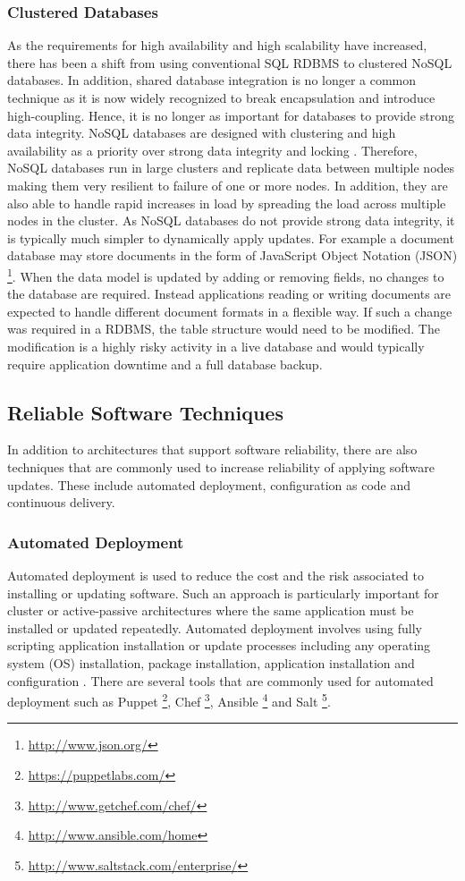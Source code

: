 \documentclass[a4paper,11pt,twoside]{article}
\begin{document}
\subsubsection{Clustered Databases}
As the requirements for high availability and high scalability have increased, there has been a shift from using conventional SQL RDBMS to clustered NoSQL databases. In addition, shared database integration is no longer a common technique as it is now widely recognized to break encapsulation and introduce high-coupling. Hence, it is no longer as important for databases to provide strong data integrity. NoSQL databases are designed with clustering and high availability as a priority over strong data integrity and locking \cite{NoSQL}. Therefore, NoSQL databases run in large clusters and replicate data between multiple nodes making them very resilient to failure of one or more nodes. In addition, they are also able to handle rapid increases in load by spreading the load across multiple nodes in the cluster. As NoSQL databases do not provide strong data integrity, it is typically much simpler to dynamically apply updates. For example a document database may store documents in the form of JavaScript Object Notation (JSON) \footnote{\url{http://www.json.org/}}. When the data model is updated by adding or removing fields, no changes to the database are required. Instead applications reading or writing documents are expected to handle different document formats in a flexible way. If such a change was required in a RDBMS, the table structure would need to be modified. The modification is a highly risky activity in a live database and would typically require application downtime and a full database backup.

\subsection{Reliable Software Techniques}
In addition to architectures that support software reliability, there are also techniques that are commonly used to increase reliability of applying software updates. These include automated deployment, configuration as code and continuous delivery.

\subsubsection{Automated Deployment}
Automated deployment is used to reduce the cost and the risk associated to installing or updating software. Such an approach is particularly important for cluster or active-passive architectures where the same application must be installed or updated repeatedly. Automated deployment involves using fully scripting application installation or update processes including any operating system (OS) installation, package installation, application installation and configuration \cite{Automated}. There are several tools that are commonly used for automated deployment such as Puppet \footnote{\url{https://puppetlabs.com/}}, Chef \footnote{\url{http://www.getchef.com/chef/}}, Ansible \footnote{\url{http://www.ansible.com/home}} and Salt \footnote{\url{http://www.saltstack.com/enterprise/}}.
\end{document}

